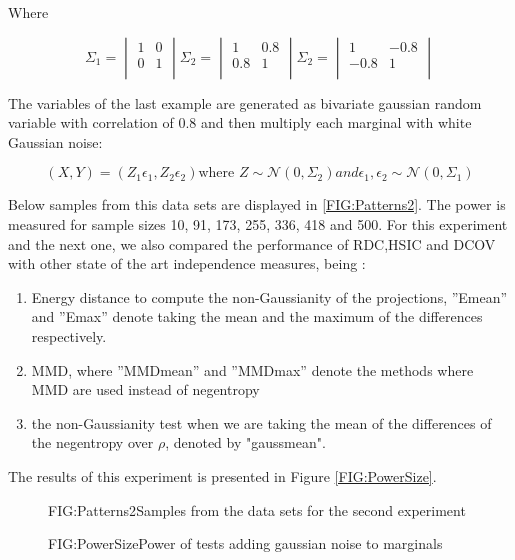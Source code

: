 Where 

$$\Sigma_{1} =\begin{vmatrix}1&0\\0&1\\ \end{vmatrix} \Sigma_{2} =\begin{vmatrix}1&0.8\\0.8&1\\ \end{vmatrix} \Sigma_{2} =\begin{vmatrix}1&-0.8\\-0.8&1\\ \end{vmatrix}$$

The variables of the last example are generated as bivariate gaussian random variable with correlation of 0.8 and then multiply each marginal with white Gaussian noise:

$$(X,Y) = (Z_{1}\epsilon_{1},Z_{2}\epsilon_{2}) \text{where } Z\sim\mathcal{N}(0,\Sigma_{2}) and \epsilon_{1},\epsilon_{2}\sim\mathcal{N}(0,\Sigma_{1})$$

Below samples from this data sets are displayed in \ref{FIG:Patterns2}. The power is measured for sample sizes 10,  91, 173, 255, 336, 418 and 500. For this experiment and the next one, we also compared the performance of RDC,HSIC and DCOV with other state of the art independence measures, being : 

\begin{enumerate}
\item Energy distance to compute the non-Gaussianity of the projections, ”Emean” and ”Emax” denote taking the mean and the maximum of the differences respectively.
\item MMD, where ”MMDmean” and ”MMDmax” denote the methods where
MMD are used instead of negentropy
\item the non-Gaussianity test when we are taking the mean of the differences of the negentropy over $\rho$, denoted by "gaussmean".
\end{enumerate}

The results of this experiment is presented in Figure \ref{FIG:PowerSize}. 

\begin{figure}[Non linear dependance patterns example 2]{FIG:Patterns2}{Samples from the data sets for the second experiment}
\end{figure}

\begin{figure}[Power of tests increasing sample size]{FIG:PowerSize}{Power of tests adding gaussian noise to marginals}
\end{figure}

